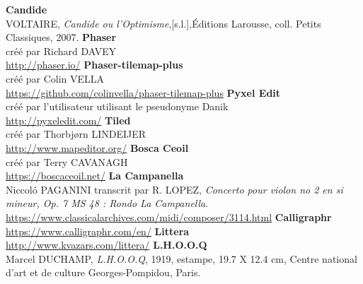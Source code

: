 \documentclass[11pt]{article}
\begin{document}
\newpage
{}
\begin{thebibliography}{9}
\textbf{Candide}\\
VOLTAIRE, \textit{Candide ou l'Optimisme},[s.l.],Éditions Larousse, coll. Petits Classiques, 2007.
\textbf{Phaser}\\
créé par Richard DAVEY\\
\url{http://phaser.io/}
\bibitem{}
\textbf{Phaser-tilemap-plus}\\
créé par Colin VELLA\\
\url{https://github.com/colinvella/phaser-tilemap-plus}
\bibitem{}
\textbf{Pyxel Edit}\\
créé par l'utilisateur utilisant le pseudonyme Danik\\
\url{http://pyxeledit.com/}
\bibitem{}
\textbf{Tiled}\\
créé par Thorbjørn LINDEIJER\\
\url{http://www.mapeditor.org/}
\bibitem{}
\textbf{Bosca Ceoil}\\
créé par Terry CAVANAGH\\
\url{https://boscaceoil.net/}
\bibitem{}
\textbf{La Campanella}\\
Niccoló PAGANINI transcrit par R. LOPEZ, \textit{Concerto pour violon no 2 en si mineur, Op. 7 MS 48 : Rondo La Campanella}.\\
\url{https://www.classicalarchives.com/midi/composer/3114.html}
\bibitem{}
\textbf{Calligraphr}\\
\url{https://www.calligraphr.com/en/}
\bibitem{}
\textbf{Littera}\\
\url{http://www.kvazars.com/littera/}
\textbf{L.H.O.O.Q}\\
Marcel DUCHAMP, \textit{L.H.O.O.Q}, 1919, estampe, 19.7 X 12.4 cm, Centre national d'art et de culture Georges-Pompidou, Paris.

\end{thebibliography}
\end{document}
